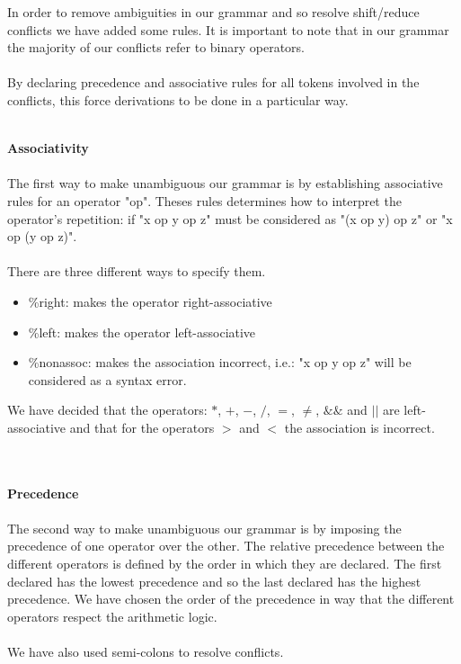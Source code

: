 \documentclass[11pt]{report}
\begin{document}
\tabto{1cm} In order to remove ambiguities in our grammar and so resolve shift/reduce conflicts we have added some rules. It is important to note that in our grammar the majority of our conflicts refer to binary operators.  \\ \\
By declaring precedence and associative rules for all tokens involved in the conflicts, this force derivations to be done in a particular way.
\\ \\ 
{} 
\tabto{2cm} \textbf{Associativity}
\\ \\
\tabto{1cm} The first way to make unambiguous our grammar is by establishing associative rules for an operator "op". Theses rules determines how to interpret the operator's repetition: if "x op y op z" must be considered as "(x op y) op z" or "x op (y op z)". \\ \\
There are three different ways to specify them. 
\begin{itemize}
\item \%right:  makes the operator right-associative
\item \%left: makes the operator left-associative
\item \%nonassoc: makes the association incorrect, i.e.: "x op y op z" will be considered as a syntax error.
\end{itemize}
We have decided that the operators: $*$, $+$, $-$, $/$, $=$, $\ne$, $\&\&$ and $||$ are left-associative and that for the operators $>$ and $<$ the association is incorrect.
\\ \\ \\
{} 
\tabto{2cm} \textbf{Precedence}
\\ \\
\tabto{1cm} The second way to make unambiguous our grammar is by imposing the precedence of one operator over the other. The relative precedence between the different operators is defined by the order in which they are declared. The first declared has the lowest precedence and so the last declared has the highest precedence. We have chosen the order of the precedence in way that the different operators respect the arithmetic logic.
\\ \\
\newpage
We have also used semi-colons to resolve conflicts. \\ \\
\end{document}
